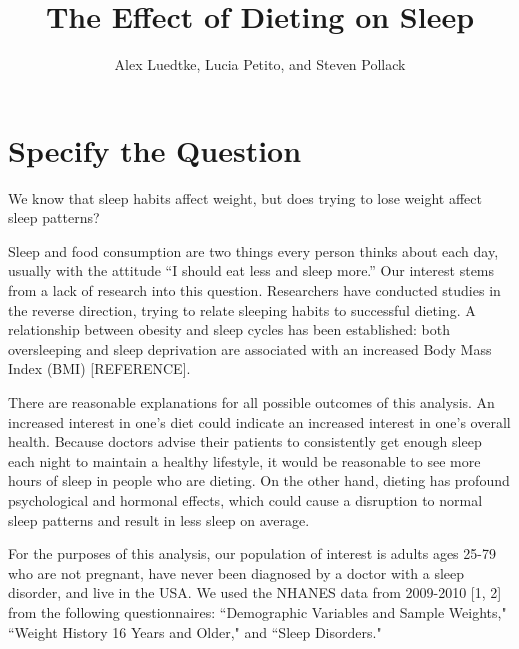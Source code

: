 \documentclass{article}
\begin{document}
%

\newcommand{\E}{\mathbb{E}}
\newcommand{\indp}{\ensuremath{\perp\hspace{-5pt}\perp}}
\newcommand{\M}{\mathcal{M}}
\newcommand{\given}{\; \mid \;}



\title{\textbf{The Effect of Dieting on Sleep}}
\author{Alex Luedtke, Lucia Petito, and Steven Pollack}
\date{}
\maketitle

\section{Specify the Question}

We know that sleep habits affect weight, but does trying to lose weight affect sleep patterns?

Sleep and food consumption are two things every person thinks about each day, usually with the attitude ``I should eat less and sleep more.''  Our interest stems from a lack of research into this question.  Researchers have conducted studies in the reverse direction, trying to relate sleeping habits to successful dieting.  A relationship between obesity and sleep cycles has been established: both oversleeping and sleep deprivation are associated with an increased Body Mass Index (BMI) [REFERENCE].  

There are reasonable explanations for all possible outcomes of this analysis.  An increased interest in one's diet could indicate an increased interest in one's overall health.  Because doctors advise their patients to consistently get enough sleep each night to maintain a healthy lifestyle, it would be reasonable to see more hours of sleep in people who are dieting.  On the other hand, dieting has profound psychological and hormonal effects, which could cause a disruption to normal sleep patterns and result in less sleep on average.

For the purposes of this analysis, our population of interest is adults ages 25-79 who are not pregnant, have never been diagnosed by a doctor with a sleep disorder, and live in the USA.  We used the NHANES data from 2009-2010 [1, 2] from the following questionnaires: ``Demographic Variables and Sample Weights," ``Weight History 16 Years and Older," and ``Sleep Disorders."
\end{document}
